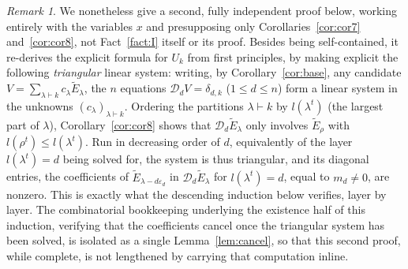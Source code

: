 \documentclass[11pt]{article}
\theoremstyle{remark}
\newtheorem{remark}[theorem]{Remark}
\begin{document}
\begin{remark}
We nonetheless give a second, fully independent proof below, working entirely with the variables $x$ and presupposing only Corollaries~\ref{cor:cor7} and~\ref{cor:cor8}, not Fact~\ref{fact:I} itself or its proof. Besides being self-contained, it re-derives the explicit formula for $U_k$ from first principles, by making explicit the following \emph{triangular} linear system: writing, by Corollary~\ref{cor:base}, any candidate $V=\sum_{\lambda\vdash k}c_\lambda\widetilde E_\lambda$, the $n$ equations $\mathcal D_dV=\delta_{d,k}$ ($1\le d\le n$) form a linear system in the unknowns $(c_\lambda)_{\lambda\vdash k}$. Ordering the partitions $\lambda\vdash k$ by $l(\lambda^t)$ (the largest part of $\lambda$), Corollary~\ref{cor:cor8} shows that $\mathcal D_d\widetilde E_\lambda$ only involves $\widetilde E_\rho$ with $l(\rho^t)\le l(\lambda^t)$. Run in decreasing order of $d$, equivalently of the layer $l(\lambda^t)=d$ being solved for, the system is thus triangular, and its diagonal entries, the coefficients of $\widetilde E_{\lambda-d\varepsilon_d}$ in $\mathcal D_d\widetilde E_\lambda$ for $l(\lambda^t)=d$, equal to $m_d\ne0$, are nonzero. This is exactly what the descending induction below verifies, layer by layer. The combinatorial bookkeeping underlying the existence half of this induction, verifying that the coefficients cancel once the triangular system has been solved, is isolated as a single Lemma~\ref{lem:cancel}, so that this second proof, while complete, is not lengthened by carrying that computation inline.
\end{remark}
\end{document}
